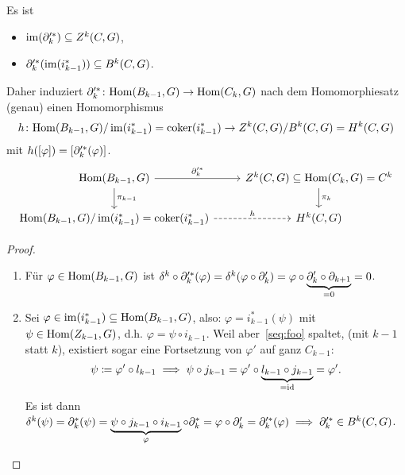 \begin{lemma}
  Es ist
  \begin{itemize}
    \item
      $\operatorname{im}(\partial_k'^*) \subseteq Z^k(C,G)$,
    \item
      $\partial_{k}'^*(\operatorname{im}(i_{k-1}^*)) \subseteq B^k(C,G)$.
  \end{itemize}
  Daher induziert $\partial_k'^*\colon \mathrm{Hom}(B_{k-1},G) \to \mathrm{Hom}(C_k,G)$ nach dem Homomorphiesatz (genau) einen Homomorphismus
  \begin{equation*}
    h \colon \mathrm{Hom}(B_{k-1},G) / \operatorname{im}(i_{k-1}^*) = \operatorname{coker}(i_{k-1}^*) \to Z^k(C,G) / B^k(C,G) = H^k(C,G)
  \end{equation*}
  mit $h([\varphi]) = [\partial_k'^*(\varphi)]$.
  \begin{equation*}
    \begin{tikzcd}
      \Hom(B_{k-1},G) \arrow{r}{\del_k'^*} \arrow{d}{\pi_{k-1}}
      & Z^k(C,G) \subseteq \Hom(C_k,G) = C^k \arrow{d}{\pi_k} \\
      \Hom(B_{k-1},G) / \im(i_{k-1}^*) = \coker(i_{k-1}^*) \arrow[dashed]{r}{h}
      & H^k(C,G)
    \end{tikzcd}
  \end{equation*}
\end{lemma}
\begin{proof}
  \begin{enumerate}
    \item
      Für $\varphi \in \mathrm{Hom}(B_{k-1},G)$ ist $\delta^k \circ \partial_{k}'^*(\varphi) = \delta^k(\varphi \circ \partial_k') = \varphi \circ \underbrace{\partial_k' \circ \partial_{k+1}}_{= 0} = 0$.
    \item
      Sei $\varphi \in \operatorname{im}(i_{k-1}^*) \subseteq  \mathrm{Hom}(B_{k-1},G)$, also: $\varphi = i_{k-1}^*(\psi)$ mit $\psi \in \mathrm{Hom}(Z_{k-1},G)$, d.h. $\varphi = \psi \circ i_{k-1}$.
      Weil aber~\eqref{seq:foo} spaltet, (mit $k-1$ statt $k$), existiert sogar eine Fortsetzung von $\varphi'$ auf ganz $C_{k-1}$:
      \begin{equation*}
        \psi \coloneqq \varphi' \circ l_{k-1} \implies \psi \circ j_{k-1} = \varphi' \circ \underbrace{l_{k-1} \circ j_{k-1}}_{= \operatorname{id}} = \varphi'.
      \end{equation*}
      Es ist dann $\delta^k(\psi) = \partial_k^* (\psi) = \underbrace{\psi \circ j_{k-1} \circ i_{k-1}}_{\varphi} \circ \partial_k^* = \varphi \circ \partial_{k}' = \partial_{k}'^*(\varphi) \implies \partial_{k}'^* \in B^k(C,G)$.
  \end{enumerate}
\end{proof}
